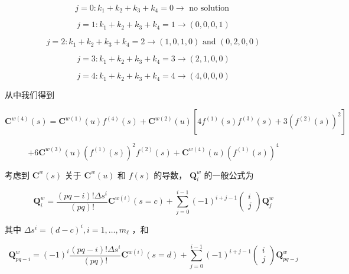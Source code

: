 \documentclass[../main.tex]{subfiles}
\begin{document}
\[
j = 0 : {k}_{1} + {k}_{2} + {k}_{3} + {k}_{4} = 0 \rightarrow  \text{ no solution }
\]

\[
j = 1 : {k}_{1} + {k}_{2} + {k}_{3} + {k}_{4} = 1 \rightarrow  \left( {0,0,0,1}\right)
\]

\[
j = 2 : {k}_{1} + {k}_{2} + {k}_{3} + {k}_{4} = 2 \rightarrow  \left( {1,0,1,0}\right) \text{ and }\left( {0,2,0,0}\right)
\]

\[
j = 3 : {k}_{1} + {k}_{2} + {k}_{3} + {k}_{4} = 3 \rightarrow  \left( {2,1,0,0}\right)
\]

\[
j = 4 : {k}_{1} + {k}_{2} + {k}_{3} + {k}_{4} = 4 \rightarrow  \left( {4,0,0,0}\right)
\]

从中我们得到

\[
{\mathbf{C}}^{w\left( 4\right) }\left( s\right)  = {\mathbf{C}}^{w\left( 1\right) }\left( u\right) {f}^{\left( 4\right) }\left( s\right)  + {\mathbf{C}}^{w\left( 2\right) }\left( u\right) \left\lbrack  {4{f}^{\left( 1\right) }\left( s\right) {f}^{\left( 3\right) }\left( s\right)  + 3{\left( {f}^{\left( 2\right) }\left( s\right) \right) }^{2}}\right\rbrack
\]

\[
+ 6{\mathbf{C}}^{w\left( 3\right) }\left( u\right) {\left( {f}^{\left( 1\right) }\left( s\right) \right) }^{2}{f}^{\left( 2\right) }\left( s\right)  + {\mathbf{C}}^{w\left( 4\right) }\left( u\right) {\left( {f}^{\left( 1\right) }\left( s\right) \right) }^{4}
\]

考虑到 \({\mathbf{C}}^{w}\left( s\right)\) 关于 \({\mathbf{C}}^{w}\left( u\right)\) 和 \(f\left( s\right)\) 的导数， \({\mathbf{Q}}_{i}^{w}\) 的一般公式为

\[
{\mathbf{Q}}_{i}^{w} = \frac{\left( {{pq} - i}\right) !\Delta {s}^{i}}{\left( {pq}\right) !}{\mathbf{C}}^{w\left( i\right) }\left( {s = c}\right)  + \mathop{\sum }\limits_{{j = 0}}^{{i - 1}}{\left( -1\right) }^{i + j - 1}\left( \begin{array}{l} i \\  j \end{array}\right) {\mathbf{Q}}_{j}^{w} \tag{6.41}
\]

其中 \(\Delta {s}^{i} = {\left( d - c\right) }^{i},i = 1,\ldots ,{m}_{\ell }\) ，和

\[
{\mathbf{Q}}_{{pq} - i}^{w} = {\left( -1\right) }^{i}\frac{\left( {{pq} - i}\right) !\Delta {s}^{i}}{\left( {pq}\right) !}{\mathbf{C}}^{w\left( i\right) }\left( {s = d}\right)  + \mathop{\sum }\limits_{{j = 0}}^{{i - 1}}{\left( -1\right) }^{i + j - 1}\left( \begin{array}{l} i \\  j \end{array}\right) {\mathbf{Q}}_{{pq} - j}^{w} \tag{6.42}
\]
\end{document}
